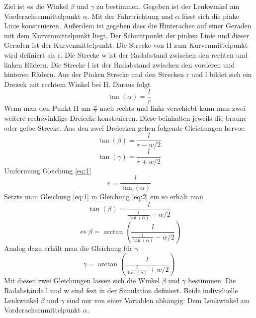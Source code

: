 Ziel ist es die Winkel $\beta$ und $\gamma$ zu bestimmen.
Gegeben ist der Lenkwinkel am Vorderachsenmittelpunkt $\alpha$. 
Mit der Fahrtrichtung und $\alpha$ lässt sich die pinke Linie konstruieren. 
Außerdem ist gegeben dass die Hinterachse auf einer Geraden mit dem Kurvenmittelpunkt liegt.
Der Schnittpunkt der pinken Linie und dieser Geraden ist der Kurvenmittelpunkt.
Die Strecke von H zum Kurvenmittelpunkt wird definiert als r.
Die Strecke w ist der Radabstand zwischen den rechten und linken Rädern.
Die Strecke l ist der Radabstand zwischen den vorderen und hinteren Rädern.
Aus der Pinken Strecke und den Strecken r und l bildet sich ein Dreieck mit rechtem Winkel bei H.
Daraus folgt 
\begin{equation} \label{eq:1}
    \tan(\alpha) = \frac{l}{r}
\end{equation}
Wenn man den Punkt H um $\frac{w}{2}$ nach rechts und links verschiebt kann man zwei weitere rechtwinklige Dreiecke konstruieren.
Diese beinhalten jeweils die braune oder gelbe Strecke. 
Aus den zwei Dreiecken gehen folgende Gleichungen hervor:
\begin{equation} \label{eq:2}
    \tan(\beta) = \frac{l}{r-w/2} 
\end{equation}
\begin{equation}  \label{eq:3}
    \tan(\gamma) = \frac{l}{r+w/2} 
\end{equation}
Umformung Gleichung \ref{eq:1}
\begin{equation} \label{eq:4}
    r = \frac{l}{\tan(\alpha)}
\end{equation}
Setzte man Gleichung \ref{eq:1} in Gleichung \ref{eq:2} ein so erhält man
\[ \tan(\beta) = \frac{l}{\frac{l}{\tan(\alpha)}-w/2}\] 
\[ \iff \beta = \arctan(\frac{l}{\frac{l}{\tan(\alpha)}-w/2})\] 
Analog dazu erhält man die Gleichung für $\gamma$
\[ \gamma = \arctan(\frac{l}{\frac{l}{\tan(\alpha)}+w/2})\] 
Mit diesen zwei Gleichungen lassen sich die Winkel $\beta$ und $\gamma$ bestimmen.
Die Radabstände l und w sind fest in der Simulation definiert.
Beide individuelle Lenkwinkel $\beta$ und $\gamma$ sind nur von einer Variablen abhängig: Dem Lenkwinkel am Vorderachsenmittelpunkt $\alpha$.
\cite{ackerman:2021}